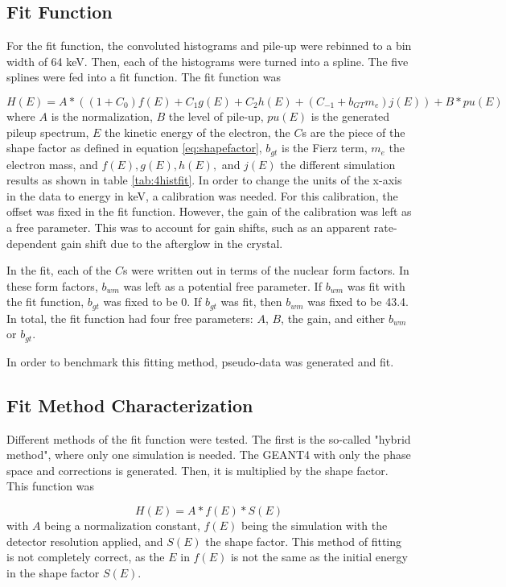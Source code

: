 \documentclass[../MaxHughesThesis.tex]{subfiles}
\begin{document}
\subsection{Fit Function}
For the fit function, the convoluted histograms and pile-up were rebinned to a bin width of 64 keV.
Then, each of the histograms were turned into a spline. 
The five splines were fed into a fit function.
The fit function was

\begin{equation}
	H(E) = A * (( 1 + C_{0}) f(E) + C_{1}g(E) + C_{2} h(E) + (C_{-1} + b_{GT} m_{e}) j(E)) + B * pu(E)
	\label{eq:betafit}
\end{equation}
where $A$ is the normalization, $B$ the level of pile-up, $pu(E)$ is the generated pileup spectrum, $E$ the kinetic energy of the electron, the $C$s are the piece of the shape factor as defined in equation \ref{eq:shapefactor},  $b_{gt}$ is the Fierz term, $m_{e}$ the electron mass, and $f(E),g(E),h(E),$ and $j(E)$ the different simulation results as shown in table \ref{tab:4histfit}.
In order to change the units of the x-axis in the data to energy in keV, a calibration was needed.
For this calibration, the offset was fixed in the fit function.
However, the gain of the calibration was left as a free parameter.
This was to account for gain shifts, such as an apparent rate-dependent gain shift due to the afterglow in the crystal.

In the fit, each of the $C$s were written out in terms of the nuclear form factors.
In these form factors, $b_{wm}$ was left as a potential free parameter. 
If $b_{wm}$ was fit with the fit function, $b_{gt}$ was fixed to be 0. 
If $b_{gt}$ was fit, then $b_{wm}$ was fixed to be 43.4. 
In total, the fit function had four free parameters:
$A$, $B$, the gain, and either $b_{wm}$ or $b_{gt}$. 

In order to benchmark this fitting method, pseudo-data was generated and fit.


\subsection{Fit Method Characterization}
Different methods of the fit function were tested. 
The first is the so-called "hybrid method", where only one simulation is needed.
The GEANT4 with only the phase space and corrections is generated. 
Then, it is multiplied by the shape factor.
This function was 

\begin{equation}
	H(E) = A * f(E) * S(E)
	\label{eq:hybridmodel}
\end{equation}
with $A$ being a normalization constant, $f(E)$ being the simulation with the detector resolution applied, and $S(E)$ the shape factor. 
This method of fitting is not completely correct, as the $E$ in $f(E)$ is not the same as the initial energy in the shape factor $S(E)$. 
\end{document}
